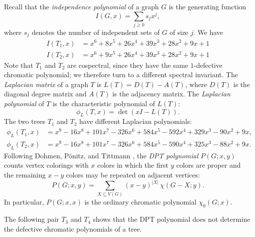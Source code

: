 \documentclass[12pt,reqno]{amsart}
\theoremstyle{definition}
\begin{document}
Recall that the \emph{independence polynomial} of a graph $G$ is the generating function
\[
I(G,x)=\sum_{j\ge 0} s_j x^j,
\]
where $s_j$ denotes the number of independent sets of $G$ of size $j$. We have 
\begin{align*}
I(T_1, x)&=x^6 + 8x^5 + 26x^4 + 39x^3 + 28x^2 + 9x + 1 \\
I(T_2, x)&=x^6 + 9x^5 + 26x^4 + 39x^3 + 28x^2 + 9x + 1
\end{align*}
Note that $T_1$ and $T_2$ are cospectral, since they have the same $1$-defective chromatic polynomial; we therefore turn to a different spectral invariant. The \emph{Laplacian matrix} of a graph $T$ is $L(T)=D(T)-A(T)$, where $D(T)$ is the diagonal degree matrix and $A(T)$ is the adjacency matrix. The \emph{Laplacian polynomial} of $T$ is the characteristic polynomial of $L(T)$:
\[
\phi_L(T,x)=\det(xI-L(T)).
\]
The two trees $T_1$ and $T_2$ have different Laplacian polynomials:
\begin{align*}
\phi_{L}(T_1, x) &= x^9 - 16x^8 + 101x^7 - 326x^6 + 584x^5 - 592x^4 + 329x^3 - 90x^2 + 9x, \\
\phi_{L}(T_2, x) &= x^9 - 16x^8 + 101x^7 - 326x^6 + 584x^5 - 590x^4 + 325x^3 - 88x^2 + 9x.
\end{align*}
Following Dohmen, P\"onitz, and Tittmann \cite{DPT03}, the \emph{DPT polynomial} $P(G;x,y)$ counts vertex colorings with $x$ colors in which the first $y$ colors are proper and the remaining $x-y$ colors may be repeated on adjacent vertices:
\[
P(G;x,y)=\sum_{X\subseteq V(G)} (x-y)^{|X|}\,\chi(G-X;y).
\]
In particular, $P(G;x,x)$ is the ordinary chromatic polynomial $\chi_0(G; x)$. 

The following pair $T_3$ and $T_4$ shows that the DPT polynomial does not determine the defective chromatic polynomials of a tree. 
\end{document}
